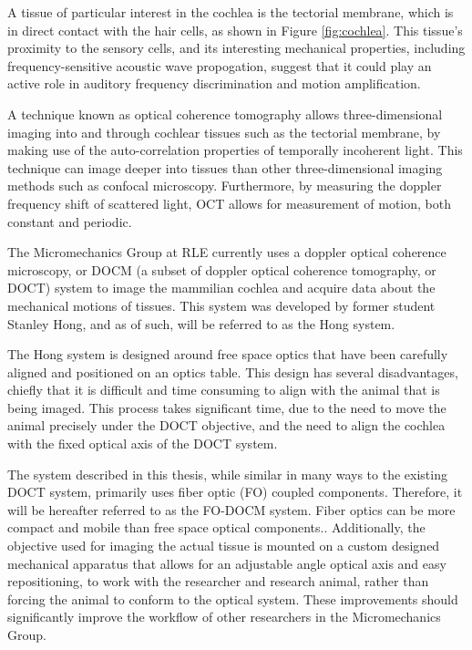 A tissue of particular interest in the cochlea is the tectorial membrane, which is in direct contact with the hair cells, as shown in Figure \ref{fig:cochlea}. This tissue's proximity to the sensory cells, and its interesting mechanical properties, including frequency-sensitive acoustic wave propogation, suggest that it could play an active role in auditory frequency discrimination and motion amplification. \cite{Ghaffari2010}


A technique known as optical coherence tomography allows three-dimensional imaging into and through cochlear tissues such as the tectorial membrane, by making use of the auto-correlation properties of temporally incoherent light. This technique can image deeper into tissues than other three-dimensional imaging methods such as confocal microscopy. Furthermore, by measuring the doppler frequency shift of scattered light, OCT allows for measurement of motion, both constant and periodic. \cite{DrexlerBook}

The Micromechanics Group at RLE currently uses a doppler optical coherence microscopy, or DOCM (a subset of doppler optical coherence tomography, or DOCT) system to image the mammilian cochlea and acquire data about the mechanical motions of tissues. This system was developed by former student Stanley Hong, and as of such, will be referred to as the Hong system. \cite{hong}

The Hong system is designed around free space optics that have been carefully aligned and positioned on an optics table. This design has several disadvantages, chiefly that it is difficult and time consuming to align with the animal that is being imaged. This process takes significant time, due to the need to move the animal precisely under the DOCT objective, and the need to align the cochlea with the fixed optical axis of the DOCT system.

The system described in this thesis, while similar in many ways to the existing DOCT system, primarily uses fiber optic (FO) coupled components. Therefore, it will be hereafter referred to as the FO-DOCM system. Fiber optics can be more compact and mobile than free space optical components.. Additionally, the objective used for imaging the actual tissue is mounted on a custom designed mechanical apparatus that allows for an adjustable angle optical axis and easy repositioning, to work with the researcher and research animal, rather than forcing the animal to conform to the optical system. These improvements should significantly improve the workflow of other researchers in the Micromechanics Group.

